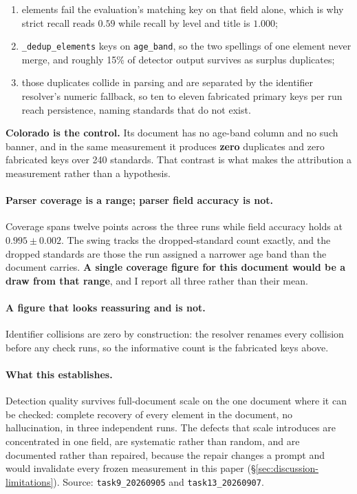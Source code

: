 \begin{enumerate}
  \item elements fail the evaluation's matching key on that field alone, which
    is why strict recall reads $0.59$ while recall by level and title is
    $1.000$;
  \item \texttt{\_dedup\_elements} keys on \texttt{age\_band}, so the two
    spellings of one element never merge, and roughly 15\% of detector output
    survives as surplus duplicates;
  \item those duplicates collide in parsing and are separated by the
    identifier resolver's numeric fallback, so ten to eleven fabricated primary
    keys per run reach persistence, naming standards that do not exist.
\end{enumerate}

\textbf{Colorado is the control.} Its document has no age-band column and no
such banner, and in the same measurement it produces \textbf{zero} duplicates
and zero fabricated keys over 240 standards. That contrast is what makes the
attribution a measurement rather than a hypothesis.

\paragraph{Parser coverage is a range; parser field accuracy is not.} Coverage
spans twelve points across the three runs while field accuracy holds at $0.995
\pm 0.002$. The swing tracks the dropped-standard count exactly, and the
dropped standards are those the run assigned a narrower age band than the
document carries. \textbf{A single coverage figure for this document would be a
draw from that range}, and I report all three rather than their mean.

\paragraph{A figure that looks reassuring and is not.} Identifier collisions
are zero by construction: the resolver renames every collision before any
check runs, so the informative count is the fabricated keys above.

\paragraph{What this establishes.} Detection quality survives full-document
scale on the one document where it can be checked: complete recovery of every
element in the document, no hallucination, in three independent runs. The
defects that scale introduces are concentrated in one field, are systematic
rather than random, and are documented rather than repaired, because the repair
changes a prompt and would invalidate every frozen measurement in this paper
(\S\ref{sec:discussion-limitations}). Source:
\texttt{task9\_20260905} and \texttt{task13\_20260907}.
